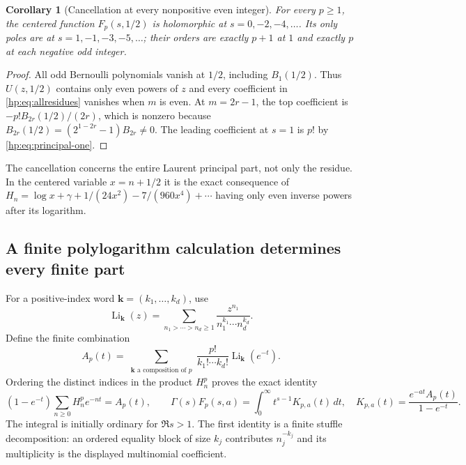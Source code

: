 \documentclass[11pt,a4paper]{article}
\numberwithin{equation}{section}
\newtheorem{corollary}[theorem]{Corollary}
\theoremstyle{definition}
\theoremstyle{remark}
\begin{document}
\begin{corollary}[Cancellation at every nonpositive even integer]
\label{hp:cor:centered}
For every $p\ge1$, the centered function $F_p(s,1/2)$ is holomorphic
at $s=0,-2,-4,\ldots$. Its only poles are at
$s=1,-1,-3,-5,\ldots$; their orders are exactly $p+1$ at $1$ and
exactly $p$ at each negative odd integer.
\end{corollary}
\begin{proof}
All odd Bernoulli polynomials vanish at $1/2$, including $B_1(1/2)$.
Thus $U(z,1/2)$ contains only even powers of $z$ and every coefficient
in \eqref{hp:eq:allresidues} vanishes when $m$ is even.
At $m=2r-1$, the top coefficient is
$-p!B_{2r}(1/2)/(2r)$, which is nonzero because
$B_{2r}(1/2)=(2^{1-2r}-1)B_{2r}\ne0$. The leading coefficient at
$s=1$ is $p!$ by \eqref{hp:eq:principal-one}.
\end{proof}

The cancellation concerns the entire Laurent principal part, not only
the residue. In the centered variable $x=n+1/2$ it is the exact
consequence of
$H_n=\log x+\gamma+1/(24x^2)-7/(960x^4)+\cdots$ having only even
inverse powers after its logarithm.

\subsection{A finite polylogarithm calculation determines every finite part}

For a positive-index word $\boldsymbol{k}=(k_1,\ldots,k_d)$, use
\[
 \operatorname{Li}_{\boldsymbol{k}}(z)
 =\sum_{n_1>\cdots>n_d\ge1}
       \frac{z^{n_1}}{n_1^{k_1}\cdots n_d^{k_d}}.
\]
Define the finite combination
\begin{equation}\label{hp:def:A}
 A_p(t)=\sum_{\substack{\boldsymbol{k}\text{ a composition of }p}}
     \frac{p!}{k_1!\cdots k_d!}
                  \operatorname{Li}_{\boldsymbol{k}}(e^{-t}).
\end{equation}
Ordering the distinct indices in the product $H_n^p$ proves the exact
identity
\begin{equation}\label{hp:eq:kernel}
 (1-e^{-t})\sum_{n\ge0}H_n^pe^{-nt}=A_p(t),\qquad
 \Gamma(s)F_p(s,a)=\int_0^\infty t^{s-1}K_{p,a}(t)\,dt,
 \quad K_{p,a}(t)=\frac{e^{-at}A_p(t)}{1-e^{-t}}.
\end{equation}
The integral is initially ordinary for $\Re s>1$. The first identity
is a finite stuffle decomposition: an ordered equality block of size
$k_j$ contributes $n_j^{-k_j}$ and its multiplicity is the displayed
multinomial coefficient.
\end{document}
